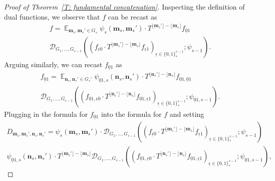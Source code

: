 \documentclass[11pt]{amsart}
\theoremstyle{definition}
\DeclareMathOperator*{\E}{\mathbb{E}}
\newcommand{\CD}{{\mathcal D}}
\newcommand{\bm}{{\mathbf{m}}}
\newcommand{\bn}{{\mathbf{n}}}
\newcommand{\ueps}{{\underline{\epsilon}}}
\newcommand{\1}{{\mathbf{1}}}
\newcommand{\sfloor}[1]{{\lfloor #1 \rfloor}}
\begin{document}
\begin{proof}[Proof of Theorem~\ref{T: fundamental concatenation}]
Inspecting the definition of dual functions, we observe that $f$ can be recast  as
\begin{multline*}
    f = \E_{\bm_s,\bm_s'\in G_s} \psi_s(\bm_s,\bm_s')\cdot T^{\sfloor{\bm_s'}-\sfloor{\bm_s}}f_{\underline{0}1} \\ \CD_{G_1,\dots,G_{s-1}}((f_{\ueps 0}\cdot T^{\sfloor{\bm_s'}-\sfloor{\bm_s}} f_{\ueps 1})_{\ueps\in\{0,1\}^{s-1}_{\ast}}; \psi_{s-1}).
\end{multline*}
Arguing similarly, we can recast $f_{\underline{0}1}$ as 
\begin{multline*}
    f_{\underline{0}1} = \E_{\bn_s,\bn_s'\in G_s'} \psi_{\underline{0}1, s}(\bn_s,\bn_s')\cdot T^{\sfloor{\bn_s'}-\sfloor{\bn_s}}f_{\underline{0}1, \underline{0}1} \\ \CD_{G_1,\dots,G_{s-1}}((f_{\underline{0}1, \ueps 0}\cdot T^{\sfloor{\bn_s'}-\sfloor{\bn_s}} f_{\underline{0}1, \ueps 1})_{\ueps\in\{0,1\}^{s-1}_{\ast}};\psi_{\underline{0}1,s-1}).
\end{multline*}
Plugging in the formula for $f_{\underline{0}1}$ into the formula for $f$ and setting
\begin{multline*}
    D_{\bm_s,\bm_s', \bn_s,\bn_s'} = \psi_s(\bm_s,\bm_s')\cdot\CD_{G_1,\dots,G_{s-1}}((f_{\ueps 0}\cdot T^{\sfloor{\bm_s'}-\sfloor{\bm_s}} f_{\ueps 1})_{\ueps\in\{0,1\}^{s-1}_{\ast}}; \psi_{s-1})\\
    \psi_{\underline{0}1, s}(\bn_s,\bn_s')\cdot T^{\sfloor{\bm_s'}-\sfloor{\bm_s}}\CD_{G_1,\dots,G_{s-1}}((f_{\underline{0}1, \ueps 0}\cdot T^{\sfloor{\bn_s'}-\sfloor{\bn_s}} f_{\underline{0}1, \ueps 1})_{\ueps\in\{0,1\}^{s-1}_{\ast}};\psi_{\underline{0}1,s-1}),
\end{multline*}

\end{proof}
\end{document}
